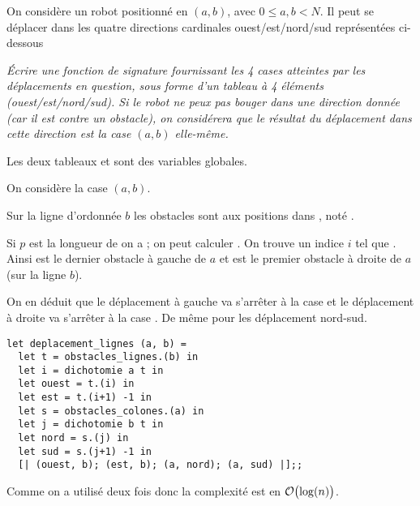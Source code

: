 On considère un robot positionné en $(a, b)$, avec $0 \leq a,b < N$. Il
peut se déplacer dans les quatre directions cardinales
ouest/est/nord/sud représentées ci-dessous

\begin{center}
\end{center}
\begin{Exercise}\it
Écrire une fonction
 de signature  fournissant les 4 cases atteintes par les déplacements en
question, sous forme d’un tableau à 4 éléments (ouest/est/nord/sud). Si le robot ne peux pas bouger
dans une direction donnée (car il est contre un obstacle), on considérera
que le résultat du déplacement dans cette direction est la case $(a,b)$ elle-même. 

Les deux tableaux  et  sont des
variables globales.
\end{Exercise}
\begin{Answer}
On considère la case $(a,b)$.

Sur la ligne d'ordonnée $b$ les obstacles sont aux positions dans , noté .

Si $p$ est la longueur de  on a  ; on peut calculer . On trouve un indice $i$ tel que . Ainsi  est le dernier obstacle à gauche de $a$ et  est le premier obstacle à droite de $a$ (sur la ligne $b$).

On en déduit que le déplacement à gauche va s'arrêter à la case  et le déplacement à droite va s'arrêter à la case .
De même pour les déplacement nord-sud.
\begin{lstlisting}
let deplacement_lignes (a, b) =
  let t = obstacles_lignes.(b) in
  let i = dichotomie a t in
  let ouest = t.(i) in
  let est = t.(i+1) -1 in
  let s = obstacles_colones.(a) in
  let j = dichotomie b t in
  let nord = s.(j) in
  let sud = s.(j+1) -1 in
  [| (ouest, b); (est, b); (a, nord); (a, sud) |];;
\end{lstlisting}

Comme on a utilisé deux fois  donc la complexité est en ${\cal O}\bigl(\log(n)\bigr)$.

\newpage
\end{Answer}

